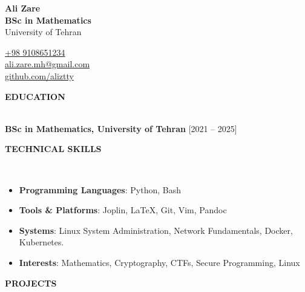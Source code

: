 \documentclass[10pt,article]{article}
\newcommand{\resheading}[1]{%
  {\small \colorbox{mygrey}{%
  \begin{minipage}{0.99\textwidth}\centering \textbf{#1 \vphantom{p\^{E}}}\end{minipage}}}}
\begin{document}
\begin{table}
\begin{minipage}{.45\linewidth}
      \begin{flushleft}
      	\textbf{\Large Ali Zare} \\
	    \textbf{BSc in Mathematics} \\
        University of Tehran
      \end{flushleft}
\end{minipage}
\hfill
\begin{minipage}{.45\linewidth}
      \begin{flushright}
	\href{tel:+989108651234}{+98 9108651234}\\
	\href{mailto:ali.zare.mh@gmail.com}{ali.zare.mh@gmail.com} \\
	\href{https://github.com/aliztty}{github.com/aliztty}
      \end{flushright}
\end{minipage}
\end{table}

\noindent
\resheading{EDUCATION}\\[0.4cm]
\textbf{BSc in Mathematics, University of Tehran} \hfill {[2021 – 2025]}\\

\noindent
\resheading{TECHNICAL SKILLS}\\[-0.5cm]

\begin{itemize}
  \item \textbf{Programming Languages}: Python, Bash\\[-0.4cm]
  \item \textbf{Tools \& Platforms}: Joplin, \LaTeX, Git, Vim, Pandoc \\[-0.4cm]
  \item \textbf{Systems}: Linux System Administration, Network Fundamentals, Docker, Kubernetes. \\[-0.4cm]
  \item \textbf{Interests}: Mathematics, Cryptography, CTFs, Secure Programming, Linux
\end{itemize}

\noindent
\resheading{PROJECTS}\\[-0.5cm]
\end{document}
